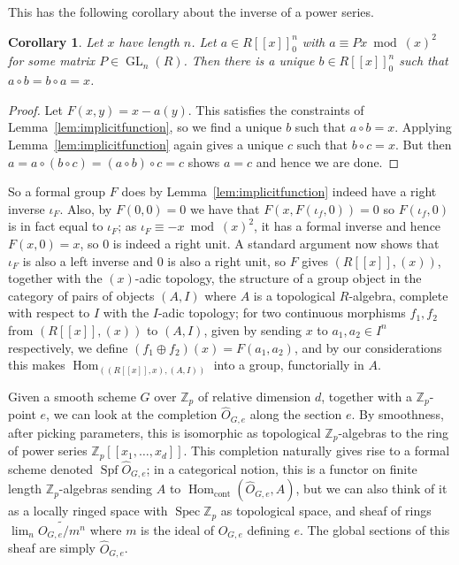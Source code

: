 \documentclass[12pt]{article}
\newcommand{\Z}{\mathbb{Z}}
\DeclareMathOperator{\Hom}{Hom}
\DeclareMathOperator{\Spec}{Spec}
\DeclareMathOperator{\Spf}{Spf}
\DeclareMathOperator{\GL}{GL}
\theoremstyle{plain}
\newtheorem{cor}[thm]{Corollary} %
\theoremstyle{definition}
\theoremstyle{remark}
\begin{document}
This has the following corollary about the inverse of a power series.
\begin{cor}
\label{lem:formalinverse}
Let $x$ have length $n$. Let $a \in R[[x]]_0^n$ with $a \equiv Px \bmod (x)^2$ for some matrix $P\in \GL_n(R)$. Then there is a unique $b \in R[[x]]_0^n$ such that $a \circ b = b \circ a = x$.
\end{cor}
\begin{proof}
Let $F(x,y) = x - a(y)$. This satisfies the constraints of Lemma~\ref{lem:implicitfunction}, so we find a unique $b$ such that $a \circ b = x$. Applying Lemma~\ref{lem:implicitfunction} again gives a unique $c$ such that $b \circ c = x$. But then $a = a \circ (b \circ c) = (a \circ b) \circ c = c$ shows $a = c$ and hence we are done.
\end{proof}
So a formal group $F$ does by Lemma~\ref{lem:implicitfunction} indeed have a right inverse $\iota_F$. Also, by $F(0,0) = 0$ we have that $F(x,F(\iota_f,0)) = 0$ so $F(\iota_f,0)$ is in fact equal to $\iota_F$; as $\iota_F \equiv -x \bmod (x)^2$, it has a formal inverse and hence $F(x,0) = x$, so $0$ is indeed a right unit. A standard argument now shows that $\iota_F$ is also a left inverse and $0$ is also a right unit, so $F$ gives $(R[[x]],(x))$, together with the $(x)$-adic topology, the structure of a group object in the category of pairs of objects $(A,I)$ where $A$ is a topological $R$-algebra, complete with respect to $I$ with the $I$-adic topology; for two continuous morphisms $f_1,f_2$ from $(R[[x]],(x))$ to $(A,I)$, given by sending $x$ to $a_1,a_2 \in I^n$ respectively, we define $(f_1 \oplus f_2)(x) = F(a_1,a_2)$, and by our considerations this makes $\Hom_((R[[x]],x),(A,I))$ into a group, functorially in $A$.

Given a smooth scheme $G$ over $\Z_p$ of relative dimension $d$, together with a $\Z_p$-point $e$, we can look at the completion $\widehat{O}_{G,e}$ along the section $e$. By smoothness, after picking parameters, this is isomorphic as topological $\Z_p$-algebras to the ring of power series $\Z_p[[x_1,\dots,x_d]]$. This completion naturally gives rise to a formal scheme denoted $\Spf \widehat{O}_{G,e}$; in a categorical notion, this is a functor on finite length $\Z_p$-algebras sending $A$ to $\Hom_{\text{cont}}(\widehat{O}_{G,e},A)$, but we can also think of it as a locally ringed space with $\Spec \Z_p$ as topological space, and sheaf of rings $\lim_n \widetilde{O_{G,e}/m^n}$ where $m$ is the ideal of $O_{G,e}$ defining $e$. The global sections of this sheaf are simply $\widehat{O}_{G,e}$. 
\end{document}
